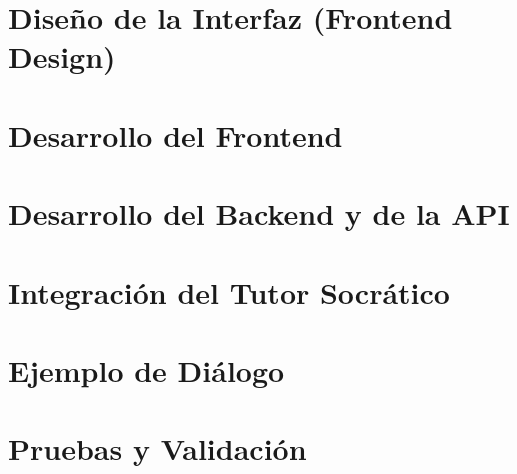 
\section{Diseño de la Interfaz (Frontend Design)}


\section{Desarrollo del Frontend}


\section{Desarrollo del Backend y de la API}


\section{Integración del Tutor Socrático}


\section{Ejemplo de Diálogo}


\section{Pruebas y Validación}

